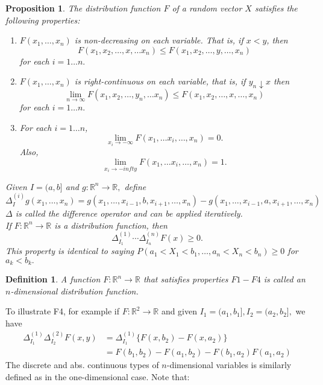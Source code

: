 \documentclass[12pt]{report} \addtolength{\textheight}{2in}
\newtheorem{defn}{Definition}
\newtheorem{prop}{Proposition}
\newcommand{\Realnum}{\mathbb{R}}
\begin{document}
\begin{prop}

The distribution function $F$ of a random vector $X$ satisfies the following properties: 
\begin{enumerate}
\item[F1:] $F(x_1,\dots, x_n)$ is non-decreasing on each variable. That is, if $x < y$, then
\begin{displaymath}
F(x_1,x_2,\dots,x,\dots x_n) \leq F(x_1,x_2,\dots,y,\dots,x_n)
\end{displaymath}
for each $i=1 \dots n.$
\item[F2:] $F(x_1,\dots, x_n)$ is right-continuous on each variable, that is, if $y_n \downarrow x$ then
\begin{displaymath}
\lim_{n\to \infty}F(x_1,x_2,\dots,y_n,\dots x_n) \leq F(x_1,x_2,\dots,x,\dots,x_n)
\end{displaymath}
for each $i=1 \dots n.$
\item[F3:] For each $i=1 \dots n$,
\begin{displaymath}
\lim_{x_i \to -\infty} F(x_1,\dots x_i,\dots,x_n) = 0.
\end{displaymath}
Also,
\begin{displaymath}
\lim_{x_i \to -infty} F(x_1,\dots x_i,\dots,x_n) = 1.
\end{displaymath}
\end{enumerate}
\item[F4:] Given $I=(a,b]$ and $g: \Realnum^n \to \Realnum,$ define
\begin{displaymath}
\Delta^{(i)}_{I} g(x_1,\dots,x_n)=g(x_1,\dots,x_{i-1},b,x_{i+1},\dots, x_n)-g(x_1,\dots,x_{i-1},a,x_{i+1},\dots, x_n)
\end{displaymath} 
$\Delta$ is called the \textit{difference operator} and can be applied iteratively. 
\\

If $F : \Realnum^n \to \Realnum$ is a distribution function, then
\begin{displaymath}
\Delta^{(1)}_{I_1} \cdots \Delta^{(n)}_{I_n} F(x) \geq 0.
\end{displaymath}
This property is identical to saying $P(a_1 < X_1 < b_1,\dots, a_n < X_n < b_n) \geq 0$ for $a_k < b_k.$
\end{prop}
\begin{defn}
A function $F: \Realnum^n \to \Realnum$ that satisfies properties $F1- F4$ is called an $n$-dimensional distribution function.
\end{defn}
To illustrate F4, for example if $F: \Realnum^{2} \to \Realnum$ and given $I_{1}=(a_1,b_1], I_2=(a_2,b_2],$ we have 
\begin{align*}
\Delta^{(1)}_{I_{1}}\Delta^{(2)}_{I_{2}} F(x,y) &=\Delta^{(1)}_{I_{1}} \{F(x,b_2)-F(x,a_2)\}\\
&=F(b_1,b_2)-F(a_1,b_2)-F(b_1,a_2)F(a_1,a_2)
\end{align*} 
The discrete and abs. continuous types of $n$-dimensional variables is similarly defined as in the one-dimensional case. Note that:
\vspace{.1in}
\end{document}
